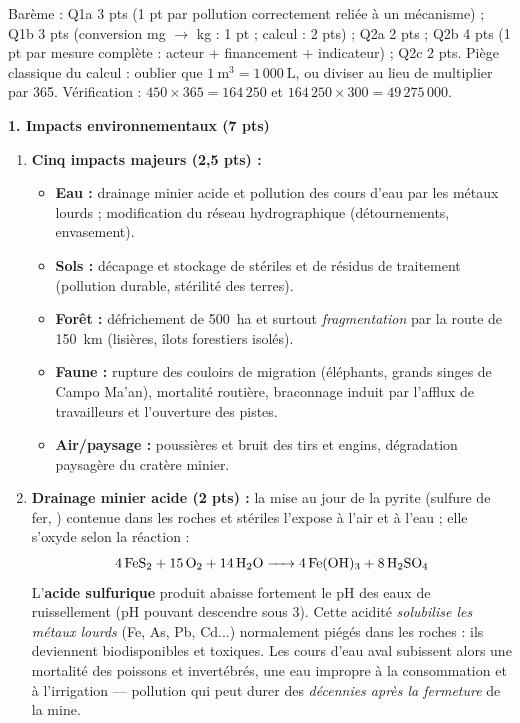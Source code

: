\documentclass[11pt]{article}
\newcommand{\cle}[1]{{\popxbold\color{popdark}#1}}
\begin{document}
\begin{attention}
Barème : Q1a 3 pts (1 pt par pollution correctement reliée à un mécanisme) ; Q1b 3 pts (conversion mg $\to$ kg : 1 pt ; calcul : 2 pts) ; Q2a 2 pts ; Q2b 4 pts (1 pt par mesure complète : acteur + financement + indicateur) ; Q2c 2 pts. Piège classique du calcul : oublier que $1\ \text{m}^3 = 1\,000\ \text{L}$, ou diviser au lieu de multiplier par 365. Vérification : $450 \times 365 = 164\,250$ et $164\,250 \times 300 = 49\,275\,000$.
\end{attention}

\begin{corrige}
\textbf{1. Impacts environnementaux (7 pts)}
\begin{enumerate}
\item \textbf{Cinq impacts majeurs (2,5 pts) :}
\begin{itemize}
\item \textbf{Eau :} drainage minier acide et pollution des cours d'eau par les métaux lourds ; modification du réseau hydrographique (détournements, envasement).
\item \textbf{Sols :} décapage et stockage de stériles et de résidus de traitement (pollution durable, stérilité des terres).
\item \textbf{Forêt :} défrichement de \SI{500}{ha} et surtout \emph{fragmentation} par la route de \SI{150}{km} (lisières, îlots forestiers isolés).
\item \textbf{Faune :} rupture des couloirs de migration (éléphants, grands singes de Campo Ma'an), mortalité routière, braconnage induit par l'afflux de travailleurs et l'ouverture des pistes.
\item \textbf{Air/paysage :} poussières et bruit des tirs et engins, dégradation paysagère du cratère minier.
\end{itemize}
\item \textbf{Drainage minier acide (2 pts) :} la mise au jour de la \cle{pyrite} (sulfure de fer, ) contenue dans les roches et stériles l'expose à l'air et à l'eau ; elle s'oxyde selon la réaction :
\[ \ce{4FeS2 + 15O2 + 14H2O -> 4Fe(OH)3 + 8H2SO4} \]
L'\textbf{acide sulfurique} produit abaisse fortement le pH des eaux de ruissellement (pH pouvant descendre sous 3). Cette acidité \emph{solubilise les métaux lourds} (Fe, As, Pb, Cd...) normalement piégés dans les roches : ils deviennent biodisponibles et toxiques. Les cours d'eau aval subissent alors une mortalité des poissons et invertébrés, une eau impropre à la consommation et à l'irrigation — pollution qui peut durer des \emph{décennies après la fermeture} de la mine.
\end{enumerate}


\end{corrige}
\end{document}
